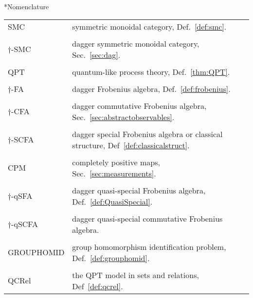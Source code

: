 \begin{chapter}*{Nomenclature}

\begin{tabular}{ll}
SMC & symmetric monoidal category, Def.~\ref{def:smc}. \\\\
$\dagger$-SMC & dagger symmetric monoidal category, Sec.~\ref{sec:dag}. \\\\
QPT & quantum-like process theory, Def.~\ref{thm:QPT}. \\\\
$\dagger$-FA & dagger Frobenius algebra, Def.~\ref{def:frobenius}. \\\\
$\dagger$-CFA & dagger commutative Frobenius algebra, Sec.~\ref{sec:abstractobservables}. \\\\
$\dagger$-SCFA & dagger special Frobenius algebra or classical structure, Def~\ref{def:classicalstruct}. \\\\
CPM & completely positive maps, Sec.~\ref{sec:measurements}. \\\\
$\dagger$-qSFA & dagger quasi-special Frobenius algebra, Def.~\ref{def:QuasiSpecial}. \\\\
$\dagger$-qSCFA & dagger quasi-special commutative Frobenius algebra. \\\\
GROUPHOMID & group homomorphism identification problem, Def.~\ref{def:grouphomid}. \\\\
QCRel & the QPT model in sets and relations, Def~\ref{def:qcrel}.
\end{tabular}
\end{chapter}
